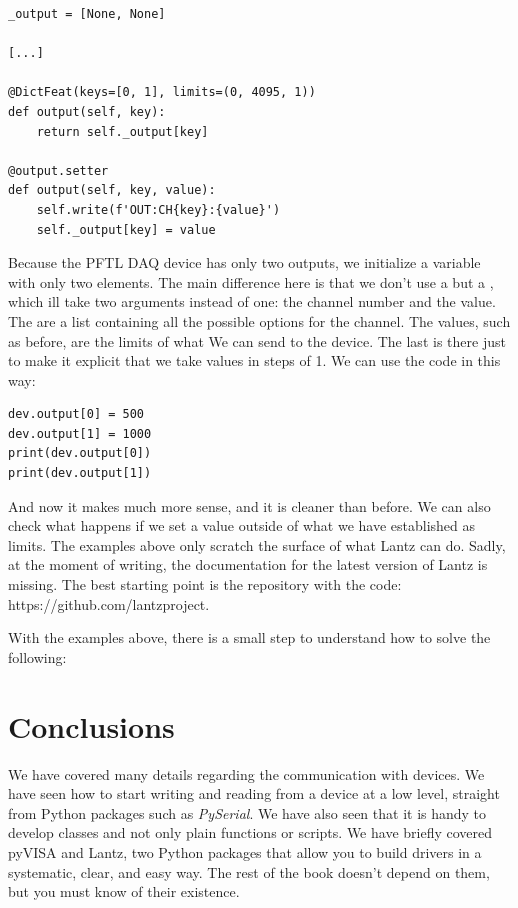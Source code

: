\begin{verbatim}
_output = [None, None]

[...]

@DictFeat(keys=[0, 1], limits=(0, 4095, 1))
def output(self, key):
    return self._output[key]

@output.setter
def output(self, key, value):
    self.write(f'OUT:CH{key}:{value}')
    self._output[key] = value
\end{verbatim}

Because the {PFTL DAQ} device has only two outputs, we initialize a variable  with only two elements. The main difference here is that we don't use a  but a , which ill take two arguments instead of one: the channel number and the value. The  are a list containing all the possible options for the channel. The values, such as before, are the limits of what We can send to the device. The last  is there just to make it explicit that we take values in steps of 1. We can use the code in this way:

\begin{verbatim}
dev.output[0] = 500
dev.output[1] = 1000
print(dev.output[0])
print(dev.output[1])
\end{verbatim}

And now it makes much more sense, and it is cleaner than before. We can also check what happens if we set a value outside of what we have established as limits. The examples above only scratch the surface of what Lantz can do. Sadly, at the moment of writing, the documentation for the latest version of Lantz is missing. The best starting point is the repository with the code: https://github.com/lantzproject.

With the examples above, there is a small step to understand how to solve the following:


\section{Conclusions}\label{sec:conclusions2}
We have covered many details regarding the communication with devices. We have seen how to start writing and reading from a device at a low level, straight from Python packages such as \emph{PySerial}. We have also seen that it is handy to develop classes and not only plain functions or scripts. We have briefly covered pyVISA and Lantz, two Python packages that allow you to build drivers in a systematic, clear, and easy way. The rest of the book doesn't depend on them, but you must know of their existence.

